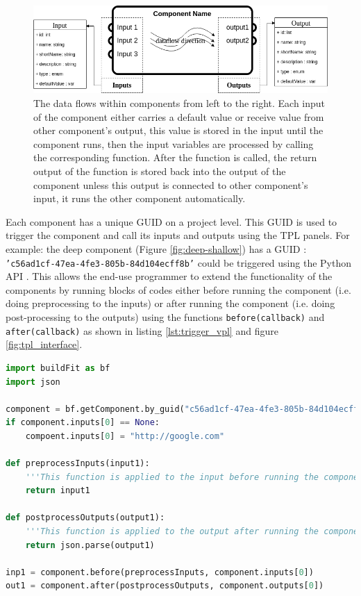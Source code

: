\documentclass{scsSimAUDPaperFormat}
\begin{document}
\begin{figure}[h]
\centering
\includegraphics[width=\columnwidth]{imgs/component.png}
\caption{The data flows within components from left to the right. Each input of the component either carries a default value or receive value from other component's output, this value is stored in the input until the component runs, then the input variables are processed by calling the corresponding function. After the function is called, the return output of the function is stored back into the output of the component unless this output is connected to other component's input, it runs the other component automatically.}
\label{fig:component}
\end{figure}

Each component has a unique GUID on a project level. This GUID is used to trigger the component and call its inputs and outputs using the TPL panels. For example: the deep component (Figure \ref{fig:deep-shallow}) has a GUID : \texttt{'c56ad1cf-47ea-4fe3-805b-84d104ecff8b'} could be triggered using the Python API . This allows the end-use programmer to extend the functionality of the components by running blocks of codes either before running the component (i.e. doing preprocessing to the inputs) or after running the component (i.e. doing post-processing to the outputs) using the functions \texttt{before(callback)} and \texttt{after(callback)} as shown in listing \ref{lst:trigger_vpl} and figure \ref{fig:tpl_interface}.

\begin{lstlisting}[style=mystyle,
language=Python,
caption={Triggering a VPL component using TPL Pyton interface},
label={lst:trigger_vpl}]
import buildFit as bf
import json

component = bf.getComponent.by_guid("c56ad1cf-47ea-4fe3-805b-84d104ecff8b")
if component.inputs[0] == None:
    compoent.inputs[0] = "http://google.com"

def preprocessInputs(input1):
    '''This function is applied to the input before running the component'''
    return input1

def postprocessOutputs(output1):
    '''This function is applied to the output after running the component'''
    return json.parse(output1)

inp1 = component.before(preprocessInputs, component.inputs[0])
out1 = component.after(postprocessOutputs, component.outputs[0])
\end{lstlisting}
\end{document}
